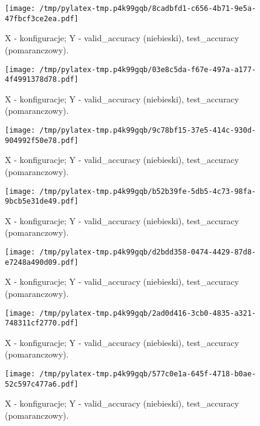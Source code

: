 \documentclass{article}%
\begin{document}
%
\newpage%


\begin{figure}[h]%
\centering%
\texttt{[image: /tmp/pylatex-tmp.p4k99gqb/8cadbfd1-c656-4b71-9e5a-47fbcf3ce2ea.pdf]}%
\caption{X {-} konfiguracje; Y {-} valid\_accuracy (niebieski), test\_accuracy (pomaranczowy).}%
\end{figure}

%
\newpage%


\begin{figure}[h]%
\centering%
\texttt{[image: /tmp/pylatex-tmp.p4k99gqb/03e8c5da-f67e-497a-a177-4f4991378d78.pdf]}%
\caption{X {-} konfiguracje; Y {-} valid\_accuracy (niebieski), test\_accuracy (pomaranczowy).}%
\end{figure}

%
\newpage%


\begin{figure}[h]%
\centering%
\texttt{[image: /tmp/pylatex-tmp.p4k99gqb/9c78bf15-37e5-414c-930d-904992f50e78.pdf]}%
\caption{X {-} konfiguracje; Y {-} valid\_accuracy (niebieski), test\_accuracy (pomaranczowy).}%
\end{figure}

%
\newpage%


\begin{figure}[h]%
\centering%
\texttt{[image: /tmp/pylatex-tmp.p4k99gqb/b52b39fe-5db5-4c73-98fa-9bcb5e31de49.pdf]}%
\caption{X {-} konfiguracje; Y {-} valid\_accuracy (niebieski), test\_accuracy (pomaranczowy).}%
\end{figure}

%
\newpage%


\begin{figure}[h]%
\centering%
\texttt{[image: /tmp/pylatex-tmp.p4k99gqb/d2bdd358-0474-4429-87d8-e7248a490d09.pdf]}%
\caption{X {-} konfiguracje; Y {-} valid\_accuracy (niebieski), test\_accuracy (pomaranczowy).}%
\end{figure}

%
\newpage%


\begin{figure}[h]%
\centering%
\texttt{[image: /tmp/pylatex-tmp.p4k99gqb/2ad0d416-3cb0-4835-a321-748311cf2770.pdf]}%
\caption{X {-} konfiguracje; Y {-} valid\_accuracy (niebieski), test\_accuracy (pomaranczowy).}%
\end{figure}

%
\newpage%


\begin{figure}[h]%
\centering%
\texttt{[image: /tmp/pylatex-tmp.p4k99gqb/577c0e1a-645f-4718-b0ae-52c597c477a6.pdf]}%
\caption{X {-} konfiguracje; Y {-} valid\_accuracy (niebieski), test\_accuracy (pomaranczowy).}%
\end{figure}
\end{document}
